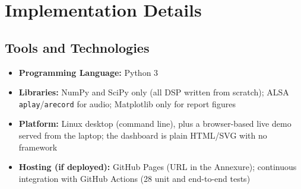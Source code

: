 \documentclass[11pt,a4paper]{report}
\begin{document}
\chapter{Implementation Details}

\section{Tools and Technologies}
\begin{itemize}
    \item \textbf{Programming Language:} Python 3
    \item \textbf{Libraries:} NumPy and SciPy only (all DSP written from scratch); ALSA
    \texttt{aplay}/\texttt{arecord} for audio; Matplotlib only for report figures
    \item \textbf{Platform:} Linux desktop (command line), plus a browser-based live
    demo served from the laptop; the dashboard is plain HTML/SVG with no framework
    \item \textbf{Hosting (if deployed):} GitHub Pages (URL in the Annexure);
    continuous integration with GitHub Actions (28 unit and end-to-end tests)
\end{itemize}
\end{document}
